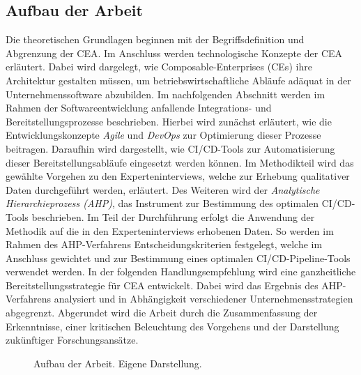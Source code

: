 \subsection{Aufbau der Arbeit}
Die theoretischen Grundlagen beginnen mit der Begriffsdefinition und Abgrenzung der CEA. Im Anschluss werden technologische Konzepte der CEA erläutert. Dabei wird dargelegt, wie Composable-Enterprises (\acs{CE}s) ihre Architektur gestalten müssen, um betriebswirtschaftliche Abläufe adäquat in der Unternehmenssoftware abzubilden. Im nachfolgenden Abschnitt werden im Rahmen der Softwareentwicklung anfallende Integrations- und Bereitstellungsprozesse beschrieben. Hierbei wird zunächst erläutert, wie die Entwicklungskonzepte \textit{Agile} und \textit{DevOps} zur Optimierung dieser Prozesse beitragen. Daraufhin wird dargestellt, wie CI/CD-Tools zur Automatisierung dieser Bereitstellungsabläufe eingesetzt werden können. Im Methodikteil wird das gewählte Vorgehen zu den Experteninterviews, welche zur Erhebung qualitativer Daten durchgeführt werden, erläutert. Des Weiteren wird der \textit{Analytische Hierarchieprozess (\acs{AHP})}, das Instrument zur Bestimmung des optimalen CI/CD-Tools beschrieben. Im Teil der Durchführung erfolgt die Anwendung der Methodik auf die in den Experteninterviews erhobenen Daten. So werden im Rahmen des AHP-Verfahrens Entscheidungskriterien festgelegt, welche im Anschluss gewichtet und zur Bestimmung eines optimalen CI/CD-Pipeline-Tools verwendet werden. In der folgenden Handlungsempfehlung wird eine ganzheitliche Bereitstellungsstrategie für CEA entwickelt. Dabei wird das Ergebnis des AHP-Verfahrens analysiert und in Abhängigkeit verschiedener Unternehmensstrategien abgegrenzt. Abgerundet wird die Arbeit durch die Zusammenfassung der Erkenntnisse, einer kritischen Beleuchtung des Vorgehens und der Darstellung zukünftiger Forschungsansätze. 

\begin{center}
	\begin{figure}[H]
		\centering
		\caption[Aufbau der Arbeit]{Aufbau der Arbeit. Eigene Darstellung.}
		\label{fig:Aufbau}
	\end{figure}	
\end{center}
\vspace*{-15mm}

